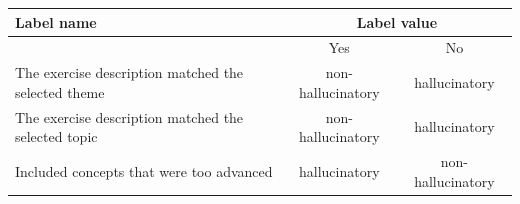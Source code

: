 \begin{tabularx}{\textwidth}{Xcc}
    \toprule
    Label name & \multicolumn{2}{c}{Label value} \\
    \midrule
    & Yes & No \\
    \midrule
    The exercise description matched the selected theme & non-hallucinatory & hallucinatory \\
    The exercise description matched the selected topic & non-hallucinatory & hallucinatory \\
    Included concepts that were too advanced & hallucinatory & non-hallucinatory \\
    \bottomrule
\end{tabularx}